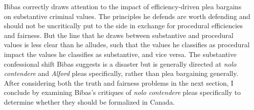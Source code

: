 Bibas correctly draws attention to the impact of efficiency-driven plea bargains on substantive criminal values. The principles he defends are worth defending and should not be uncritically put to the side in exchange for procedural efficiencies and fairness. But the line that he draws between substantive and procedural values is less clear than he alludes, such that the values he classifies as procedural impact the values he classifies as substantive, and vice versa. The substantive confessional shift Bibas suggests is a disaster but is generally directed at \textit{nolo contendere} and \textit{Alford} pleas specifically, rather than plea bargaining generally. After considering both the truth and fairness problems in the next section, I conclude by examining Bibas's critiques of \textit{nolo contendere} pleas specifically to determine whether they should be formalized in Canada.